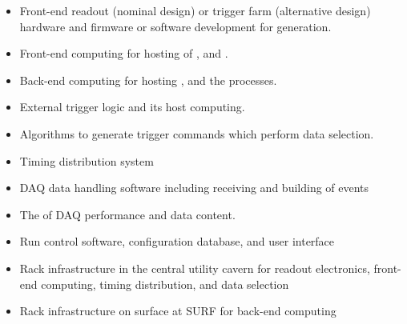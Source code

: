 \begin{itemize}
\item Front-end readout (nominal design) or trigger farm (alternative
  design) hardware and firmware or software development for
   generation.
\item Front-end computing for hosting of ,  and .
\item Back-end computing for hosting ,  and the  processes.
\item External trigger logic and its host computing.
\item Algorithms to generate trigger commands which perform data selection.
\item Timing distribution system
\item DAQ data handling software including receiving and building of
  events
\item The  of DAQ performance and data content.
\item Run control software, configuration database, and user interface
\item Rack infrastructure in the central utility cavern for readout
  electronics, front-end computing, timing distribution, and data
  selection
\item Rack infrastructure on surface at SURF for back-end computing
\end{itemize}
